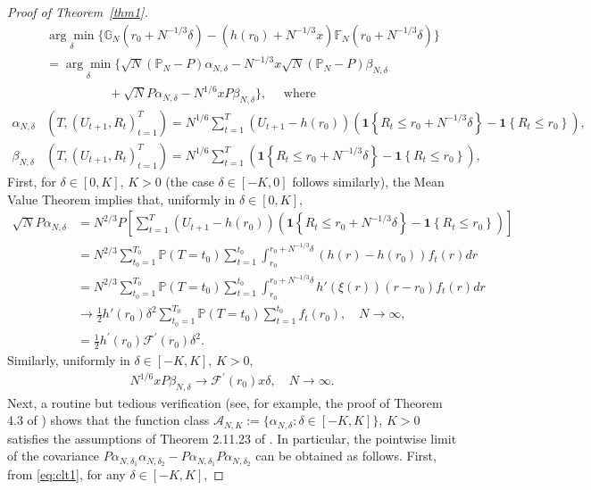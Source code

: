 \documentclass[12pt]{amsart}
\theoremstyle{plain}
\theoremstyle{remark}
\numberwithin{equation}{section}
\begin{document}
\begin{proof}[Proof of Theorem~\ref{thm1}]
\begin{align*}
& \underset{\delta}{\operatorname{arg}\operatorname{min}} \Bigg\{\mathbb{G}_{N}\left(r_{0}+N^{-1/3} 
\delta\right)-\left(h\left(r_{0}\right)+N^{-1/3}x\right)\mathbb{F}_{N}\left(r_{0}+N^{-1/3}\delta\right)\Bigg\}
\\ &= \underset{\delta}{\operatorname{arg}\operatorname{min}} \big\{\sqrt{N}(\mathbb{P}_N-P){\alpha}_{N,\delta} -  N^{-1/3} x\sqrt{N}(\mathbb{P}_N-P){\beta}_{N,\delta}\\
&\qquad \qquad \quad + \sqrt{N}P\alpha_{N,\delta}
- N^{1/6} xP{\beta}_{N,\delta}
\big\}, \quad \text{ where}\\
\alpha_{N,\delta}&(T, (U_{t+1}, R_t)_{t=1}^{T}) = N^{1/6}\sum_{t=1}^{T}(U_{t+1}-h(r_0))\left(\mathbf{1}\left\{R_{t}\le r_0+N^{-1/3}\delta\right\}-\mathbf{1}\left\{R_{t}\le r_0\right\}\right), \\
\beta_{N,\delta}&(T, (U_{t+1}, R_t)_{t=1}^{T}) = N^{1/6}\sum_{t=1}^{T}\left(\mathbf{1}\left\{R_{t}\le r_0+N^{-1/3}\delta\right\}-\mathbf{1}\left\{R_{t}\le r_0\right\}\right), 
\end{align*}
First, for \(\delta \in [0,K]\), $K > 0$ (the case $\delta \in [-K,0]$ follows similarly), the Mean Value Theorem implies that, uniformly in $\delta \in [0,K]$,
\begin{align}\label{eq:clt1}
\sqrt{N}P\alpha_{N,\delta} &= N^{2/3} P\left[\sum_{t=1}^T (U_{t+1}-h(r_0))\left(\mathbf{1}\left\{R_{t}\le r_0+N^{-1/3}\delta\right\}
- \mathbf{1}\left\{R_{t}\le r_0\right\}\right)\right] \nonumber
\\ &= N^{2/3} \sum_{t_0=1}^{T_0} \mathbb{P}(T=t_0) \sum_{t=1}^{t_0}\int_{r_0}^{r_0+N^{-1/3}\delta}(h(r)-h(r_0))f_t(r)dr \nonumber
\\ &= N^{2/3} \sum_{t_0=1}^{T_0} \mathbb{P}(T=t_0) \sum_{t=1}^{t_0}\int_{r_0}^{r_0+N^{-1/3}\delta}h'(\xi(r))(r-r_0)f_t(r)dr \nonumber
\\ &\rightarrow\frac{1}{2}h'(r_0)\delta^2\sum_{t_0=1}^{T_0} \mathbb{P}(T=t_0) \sum_{t=1}^{t_0}f_t(r_0), \quad N \to \infty, \nonumber
\\ &= \frac{1}{2} h^{\prime}\left(r_{0}\right) \mathcal{F}^{\prime}\left(r_{0}\right) \delta^{2}.
\end{align}
Similarly, uniformly in $\delta \in [-K,K]$, $K > 0$, 
\begin{align}\label{eq:clt2}
N^{1/6} xP{\beta}_{N,\delta} \to \mathcal{F}^{\prime}\left(r_{0}\right)x\delta, \quad N \to \infty.
\end{align}
Next, a routine but tedious verification (see, for example, the proof of Theorem 4.3 of \cite{WellnerZhang1998}) shows that the function class  $\mathcal{A}_{N,K} := \{\alpha_{N,\delta} : \delta \in[-K,K]\}$, $K > 0$ satisfies the assumptions of Theorem 2.11.23 of \cite{MR1385671}. In particular, the pointwise limit of the covariance \(P \alpha_{N,\delta_1} \alpha_{N,\delta_2} - P \alpha_{N,\delta_1} P \alpha_{N,\delta_2}\) can be obtained as follows. First, from \eqref{eq:clt1}, for any \(\delta \in [-K,K]\), 

\end{proof}
\end{document}
